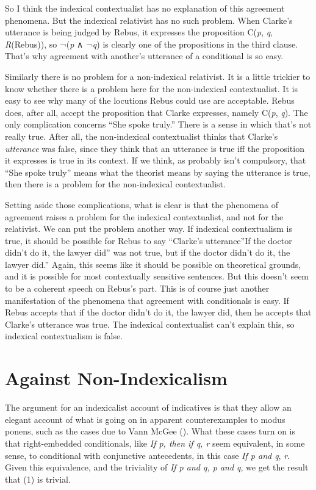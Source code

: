 \documentclass[
  10pt,
  letterpaper,
  DIV=11,
  numbers=noendperiod,
  twoside]{scrartcl}
\begin{document}
So I think the indexical contextualist has no explanation of this
agreement phenomena. But the indexical relativist has no such problem.
When Clarke's utterance is being judged by Rebus, it expresses the
proposition C(\emph{p}, \emph{q}, \emph{R}(Rebus)), so ¬(\emph{p} ∧
¬\emph{q}) is clearly one of the propositions in the third clause.
That's why agreement with another's utterance of a conditional is so
easy.

Similarly there is no problem for a non-indexical relativist. It is a
little trickier to know whether there is a problem here for the
non-indexical contextualist. It is easy to see why many of the locutions
Rebus could use are acceptable. Rebus does, after all, accept the
proposition that Clarke expresses, namely C(\emph{p}, \emph{q}). The
only complication concerns ``She spoke truly.'' There is a sense in
which that's not really true. After all, the non-indexical contextualist
thinks that Clarke's \emph{utterance} was false, since they think that
an utterance is true iff the proposition it expresses is true in its
context. If we think, as probably isn't compulsory, that ``She spoke
truly'' means what the theorist means by saying the utterance is true,
then there is a problem for the non-indexical contextualist.

Setting aside those complications, what is clear is that the phenomena
of agreement raises a problem for the indexical contextualist, and not
for the relativist. We can put the problem another way. If indexical
contextualism is true, it should be possible for Rebus to say ``Clarke's
utterance''If the doctor didn't do it, the lawyer did'' was not true,
but if the doctor didn't do it, the lawyer did.'' Again, this seems like
it should be possible on theoretical grounds, and it is possible for
most contextually sensitive sentences. But this doesn't seem to be a
coherent speech on Rebus's part. This is of course just another
manifestation of the phenomena that agreement with conditionals is easy.
If Rebus accepts that if the doctor didn't do it, the lawyer did, then
he accepts that Clarke's utterance was true. The indexical contextualist
can't explain this, so indexical contextualism is false.

\section{Against Non-Indexicalism}\label{against-non-indexicalism}

The argument for an indexicalist account of indicatives is that they
allow an elegant account of what is going on in apparent counterexamples
to modus ponens, such as the cases due to Vann McGee
(). What these cases turn on is that
right-embedded conditionals, like \emph{If p, then if q, r} seem
equivalent, in some sense, to conditional with conjunctive antecedents,
in this case \emph{If p and q}, \emph{r}. Given this equivalence, and
the triviality of \emph{If p and q, p and q}, we get the result that (1)
is trivial.
\end{document}
